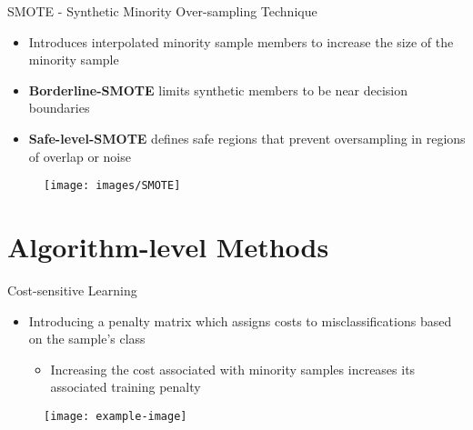 \documentclass[xcolor={dvipsnames}]{beamer}
\begin{document}
\begin{frame}{SMOTE - Synthetic Minority Over-sampling Technique}
	\begin{itemize}
		\item Introduces interpolated minority sample members to increase the size of the minority sample
		\item \textbf{Borderline-SMOTE} limits synthetic members to be near decision boundaries
		\item \textbf{Safe-level-SMOTE} defines safe regions that prevent oversampling in regions of overlap or noise
	\end{itemize}
	\begin{figure}
		\centering
		\texttt{[image: images/SMOTE]}
	\end{figure}
\end{frame}
\section{Algorithm-level Methods}
	
\begin{frame}{Cost-sensitive Learning}
		\begin{itemize}
			\item Introducing a penalty matrix which assigns costs to misclassifications based on the sample's class
			\begin{itemize}
				\item Increasing the cost associated with minority samples increases its associated training penalty
			\end{itemize}
		\end{itemize}
		\begin{figure}
			\centering
			\texttt{[image: example-image]}
		\end{figure}
\end{frame}
\end{document}
